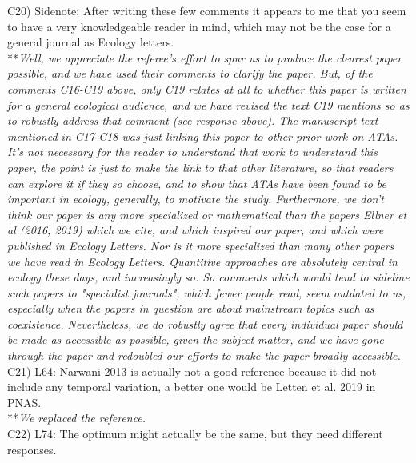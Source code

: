 \documentclass[letterpaper,11pt]{article}
\begin{document}
\noindent C20) Sidenote: After writing these few comments it appears to me that you seem to have a very knowledgeable reader in mind, which may not be the case for a general journal as Ecology letters. \\

\noindent ***\emph{Well, we appreciate the referee's effort to spur us to produce the clearest 
paper possible, and we have used their comments to clarify the paper. But, of the comments 
C16-C19 above, only C19 relates at all to whether this paper is written for a general ecological audience,
and we have revised the text C19 mentions so as to robustly address that comment (see response above). 
The manuscript text mentioned in C17-C18 was just linking this paper to other prior work on ATAs. 
It's not necessary for the reader to understand that work to understand this paper, the point is just to make 
the link to that other literature, so that readers can explore it if they so choose, 
and to show that ATAs have been found to be important in ecology, generally, to motivate the study.
Furthermore, we don't think our paper is any more specialized or mathematical than the papers Ellner et al (2016, 2019) which
we cite, and which inspired our paper, and which were published in Ecology Letters. Nor is it more 
specialized than many other papers we have read in Ecology Letters. Quantitive approaches are absolutely 
central in ecology these days, and increasingly so. So comments which would tend to sideline such papers to
"specialist journals", which fewer people read, seem outdated to us, especially when the papers in question 
are about mainstream topics such
as coexistence. Nevertheless, we do robustly agree that every individual paper should be made as accessible
as possible, given the subject matter, and we have gone through the paper and redoubled our efforts to make the 
paper broadly accessible.} \\


\noindent C21) L64: Narwani 2013 is actually not a good reference because it did not include any temporal variation, a better one would be Letten et al. 2019 in PNAS. \\

\noindent ***\emph{We replaced the reference.} \\

\noindent C22) L74: The optimum might actually be the same, but they need different responses. \\
\end{document}
